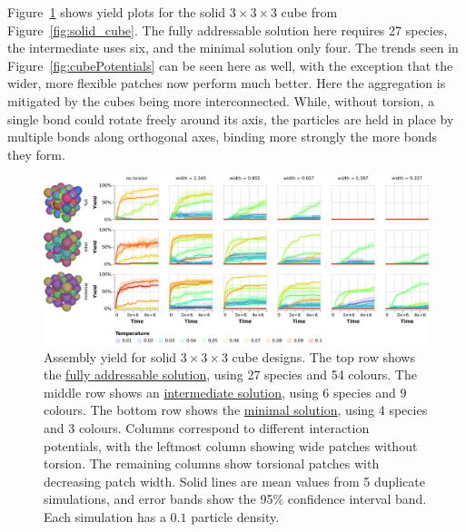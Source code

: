 Figure~\ref{fig:solidCubePotentials} shows yield plots for the solid \(3 \times 3 \times 3\) cube from Figure~\ref{fig:solid_cube}. The fully addressable solution here requires 27 species, the intermediate uses six, and the minimal solution only four.  The trends seen in Figure~\ref{fig:cubePotentials} can be seen here as well, with the exception that the wider, more flexible patches now perform much better. Here the aggregation is mitigated by the cubes being more interconnected. While, without torsion, a single bond could rotate freely around its axis, the particles are held in place by multiple bonds along orthogonal axes, binding more strongly the more bonds they form.

\begin{figure}[h]
    \centering
    \includegraphics[width=\linewidth]{figures/patchysim/solidCubePotentials.eps}
    \caption{Assembly yield for solid \(3 \times 3 \times 3\) cube designs. The top row shows the \href{https://akodiat.github.io/polycubes/?decRule=|1:0||2:1||3:0_-1:2|4:0||5:1||6:0_|7:0|-2:1|8:1||9:0_|10:0||11:1|-3:2|12:0_-4:2|||13:1||14:0_-7:2|15:0|-5:1|16:1||17:0_-10:2|18:0||19:1|-6:2|20:0_-15:2||-13:1|21:1||22:0_-18:2|||23:1|-14:2|24:0_|25:0|-11:1|26:1|-9:2|27:0_|28:0||29:1|-12:2|_-25:2|30:0|-19:1|31:1|-17:2|32:0_-28:2|33:0||34:1|-20:2|_-30:2||-23:1|35:1|-22:2|36:0_-33:2|||37:1|-24:2|_|38:0|-29:1|39:1|-27:2|_-38:2|40:0|-34:1|41:1|-32:2|_-40:2||-37:1|42:1|-36:2|_|43:0|-8:1|||44:0_-43:2|45:0|-16:1|||46:0_-45:2||-21:1|||47:0_|48:0|-26:1||-44:2|49:0_-48:2|50:0|-31:1||-46:2|51:0_-50:2||-35:1||-47:2|52:0_|53:0|-39:1||-49:2|_-53:2|54:0|-41:1||-51:2|_-54:2||-42:1||-52:2|}{fully addressable solution}, using 27 species and 54 colours. The middle row shows an \href{https://akodiat.github.io/polycubes/?assemblyMode=stochastic&rule=10101113232391001d1d8c2400a2949495970c00a5001b1a1700009d0a8598008a000400}{intermediate solution}, using 6 species and 9 colours. The bottom row shows the \href{https://akodiat.github.io/polycubes/?assemblyMode=stochastic&rule=0a0a0b0a0908878784868b00060000078e8f000c0c00000e}{minimal solution}, using 4 species and 3 colours. Columns correspond to different interaction potentials, with the leftmost column showing wide patches without torsion. The remaining columns show torsional patches with decreasing patch width. Solid lines are mean values from 5 duplicate simulations, and error bands show the 95\% confidence interval band. Each simulation has a \(0.1\) particle density.}
    \label{fig:solidCubePotentials}
\end{figure}

